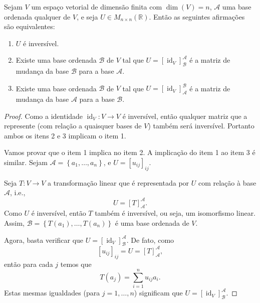\begin{theorem}
	Sejam $V$ um espaço vetorial de dimensão finita com $\dim(V)=n$, $\mathcal{A}$ uma base ordenada qualquer de $V$, e seja $U\in M_{n\times n}(\mathbb{R})$. Então as seguintes afirmações são equivalentes:
	\begin{enumerate}
		\item $U$ é inversível.
		\item Existe uma base ordenada $\mathcal{B}$ de $V$ tal que $U=\left[\operatorname{id}_V\right]_{\mathcal{B}}^{\mathcal{A}}$ é a matriz de mudança da base $\mathcal{B}$ para a base $\mathcal{A}$.
		\item Existe uma base ordenada $\mathcal{B}$ de $V$ tal que $U=\left[\operatorname{id}_V\right]_{\mathcal{A}}^{\mathcal{B}}$ é a matriz de mudança da base $\mathcal{A}$ para a base $\mathcal{B}$.
	\end{enumerate}
\end{theorem}

\begin{proof}
	Como a identidade $\operatorname{id}_V\colon V\to V$ é inversível, então qualquer matriz que a represente (com relação a quaisquer bases de $V$) também será inversível. Portanto ambos os itens 2 e 3 implicam o item 1.
	
	Vamos provar que o item 1 implica no item 2. A implicação do item 1 ao item 3 é similar. Sejam $\mathcal{A}=\left\{a_1,\ldots,a_n\right\}$, e $U=[u_{ij}]_{ij}$.
	
	Seja $T\colon V\to V$ a transformação linear que é representada por $U$ com relação à base $\mathcal{A}$, i.e.,
	\[U=\left[T\right]_{\mathcal{A}}^{\mathcal{A}}.\]
	Como $U$ é inversível, então $T$ também é inversível, ou seja, um isomorfismo linear. Assim, $\mathcal{B}=\left\{T(a_1),\ldots,T(a_n)\right\}$ é uma base ordenada de $V$.
	
	Agora, basta verificar que $U=\left[\operatorname{id}_V\right]_{\mathcal{B}}^{\mathcal{A}}$. De fato, como
	\[[u_{ij}]_{ij}=U=\left[T\right]_{\mathcal{A}}^{\mathcal{A}},\]
	então para cada $j$ temos que
	\[T(a_j)=\sum_{i=1}^n u_{ij}a_i.\]
	Estas mesmas igualdades (para $j=1,\ldots,n$) significam que $U=\left[\operatorname{id}_V\right]_{\mathcal{B}}^{\mathcal{A}}$.
\end{proof}
